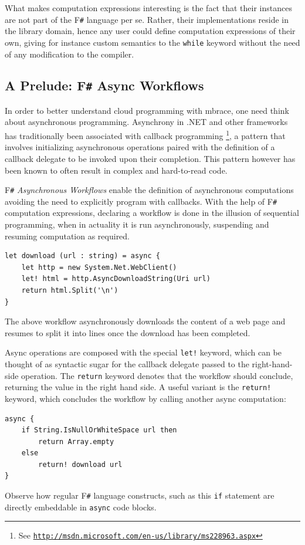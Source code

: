 \documentclass[9pt,a4paper]{article}
\newcommand{\mbrace}{mbrace}
\newcommand{\fsharp}{F\texttt \#}
\newcommand{\samehref}[1]{\href{#1}{\texttt{#1}}}
\begin{document}
What makes computation expressions interesting is the fact that their instances
are not part of the \fsharp{} language per se. Rather, their implementations
reside in the library domain, hence any user could define computation expressions
of their own, giving for instance custom semantics to the \texttt{while} keyword 
without the need of any modification to the compiler\cite{fsharp-compexpr}.

\subsection{A Prelude: \fsharp{} Async Workflows}

In order to better understand cloud programming with \mbrace{}, 
one need think about asynchronous programming. 
Asynchrony in .NET and other frameworks has traditionally been 
associated with callback programming%
\footnote{See \samehref{http://msdn.microsoft.com/en-us/library/ms228963.aspx}}, 
a pattern that involves initializing asynchronous operations paired with the definition 
of a callback delegate to be invoked upon their completion.
This pattern however has been known to often result in complex and hard-to-read code.

\fsharp{} \emph{Asynchronous Workflows} enable the definition of asynchronous 
computations avoiding the need to explicitly program with callbacks\cite{fsharp-async}. 
With the help of \fsharp{} computation expressions, 
declaring a workflow is done in the illusion of sequential programming, 
when in actuality it is run asynchronously, 
suspending and resuming computation as required.
\begin{lstlisting}
let download (url : string) = async {
    let http = new System.Net.WebClient()
    let! html = http.AsyncDownloadString(Uri url)
    return html.Split('\n')
}
\end{lstlisting}
The above workflow asynchronously downloads the content of a web page 
and resumes to split it into lines once the download has been completed.

Async operations are composed with the special \texttt{let!} keyword, 
which can be thought of as syntactic sugar for the callback delegate passed
to the right-hand-side operation.
The \texttt{return} keyword denotes that the workflow should conclude, returning 
the value in the right hand side. A useful variant is the \texttt{return!} keyword, 
which concludes the workflow by calling another async computation:
\begin{lstlisting}
async {
    if String.IsNullOrWhiteSpace url then
        return Array.empty
    else
        return! download url
}
\end{lstlisting}
Observe how regular \fsharp{} language constructs, such as this \texttt{if} statement
are directly embeddable in \texttt{async} code blocks.
\end{document}
